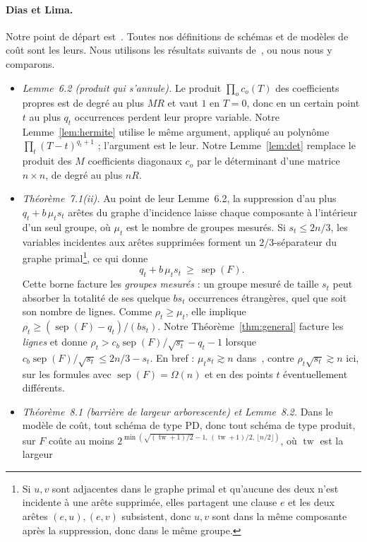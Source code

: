 \documentclass[11pt,a4paper]{article}
\theoremstyle{definition}
\theoremstyle{remark}
\newcommand{\sep}{\operatorname{sep}}
\newcommand{\tw}{\operatorname{tw}}
\begin{document}
\paragraph{Dias et Lima.} Notre point de départ est~\cite{DL}. Toutes nos définitions de
schémas et de modèles de coût sont les leurs. Nous utilisons les résultats suivants
de~\cite{DL}, ou nous nous y comparons.
\begin{itemize}
\item \emph{Lemme~6.2 (produit qui s'annule).} Le produit $\prod_o c_o(T)$ des coefficients
 propres est de degré au plus $MR$ et vaut $1$ en $T=0$, donc en un certain point $t$ au
 plus $q_t$ occurrences perdent leur propre variable. Notre Lemme~\ref{lem:hermite} utilise
 le même argument, appliqué au polynôme $\prod_{t}(T-t)^{q_t+1}$ ; l'argument est le leur.
 Notre Lemme~\ref{lem:det} remplace le produit des $M$ coefficients diagonaux $c_o$ par le
 déterminant d'une matrice $n\times n$, de degré au plus $nR$.
\item \emph{Théorème~7.1(ii).} Au point de leur Lemme~6.2, la suppression d'au plus
 $q_t+b\,\mu_ts_t$ arêtes du graphe d'incidence laisse chaque composante à l'intérieur d'un
 seul groupe, où $\mu_t$ est le nombre de groupes mesurés. Si $s_t\le 2n/3$, les variables
 incidentes aux arêtes supprimées forment un $2/3$-séparateur du graphe
 primal\footnote{Si $u,v$ sont adjacentes dans le graphe primal et qu'aucune des deux n'est
 incidente à une arête supprimée, elles partagent une clause $e$ et les deux arêtes
 $(e,u),(e,v)$ subsistent, donc $u,v$ sont dans la même composante après la suppression,
 donc dans le même groupe.}, ce qui donne
 \[
 q_t+b\,\mu_t s_t\ \ge\ \sep(F).
 \]
 Cette borne facture les \emph{groupes mesurés} : un groupe mesuré de taille $s_t$ peut
 absorber la totalité de ses quelque $bs_t$ occurrences étrangères, quel que soit son nombre
 de lignes. Comme $\rho_t\ge\mu_t$, elle implique $\rho_t\ge(\sep(F)-q_t)/(bs_t)$. Notre
 Théorème~\ref{thm:general} facture les \emph{lignes} et donne
 $\rho_t>c_b\sep(F)/\sqrt{s_t}-q_t-1$ lorsque $c_b\sep(F)/\sqrt{s_t}\le 2n/3-s_t$. En bref :
 $\mu_ts_t\gtrsim n$ dans~\cite{DL}, contre $\rho_t\sqrt{s_t}\gtrsim n$ ici, sur les formules
 avec $\sep(F)=\Omega(n)$ et en des points $t$ éventuellement différents.
\item \emph{Théorème~8.1 (barrière de largeur arborescente) et Lemme~8.2.} Dans le modèle de
 coût, tout schéma de type PD, donc tout schéma de type produit, sur $F$ coûte au moins
 $2^{\min(\sqrt{(\tw+1)/2}-1,\,(\tw+1)/2,\,\lfloor n/2\rfloor)}$, où $\tw$ est la largeur

\end{itemize}
\end{document}
